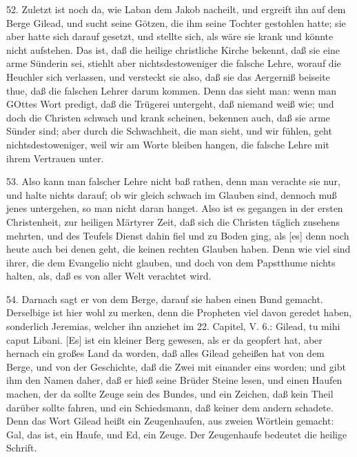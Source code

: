 52. Zuletzt ist noch da, wie Laban dem Jakob nacheilt, und ergreift ihn auf dem Berge Gilead, und sucht seine Götzen, die ihm seine Tochter gestohlen hatte; sie aber hatte sich darauf gesetzt, und stellte sich, als wäre sie krank und könnte nicht aufstehen. Das ist, daß die heilige christliche Kirche bekennt, daß sie eine arme Sünderin sei, stiehlt aber nichtsdestoweniger die falsche Lehre, worauf die Heuchler sich verlassen, und versteckt sie also, daß sie das Aergerniß beiseite thue, daß die falschen Lehrer darum kommen. Denn das sieht man: wenn man GOttes Wort predigt, daß die Trügerei untergeht, daß niemand weiß wie; und doch die Christen schwach und krank scheinen, bekennen auch, daß sie arme Sünder sind; aber durch die Schwachheit, die man sieht, und wir fühlen, geht nichtsdestoweniger, weil wir am Worte bleiben hangen, die falsche Lehre mit ihrem Vertrauen unter.

53. Also kann man falscher Lehre nicht baß rathen, denn man verachte sie nur, und halte nichts darauf; ob wir gleich schwach im Glauben sind, dennoch muß jenes untergehen, so man nicht daran hanget. Also ist es gegangen in der ersten Christenheit, zur heiligen Märtyrer Zeit, daß sich die Christen täglich zusehens mehrten, und des Teufels Dienst dahin fiel und zu Boden ging, als [es] denn noch heute auch bei denen geht, die keinen rechten Glauben haben. Denn wie viel sind ihrer, die dem Evangelio nicht glauben, und doch von dem Papstthume nichts halten, als, daß es von aller Welt verachtet wird.

54. Darnach sagt er von dem Berge, darauf sie haben einen Bund gemacht. Derselbige ist hier wohl zu merken, denn die Propheten viel davon geredet haben, sonderlich Jeremias, welcher ihn anziehet im 22. Capitel, V. 6.: Gilead, tu mihi caput Libani. [Es] ist ein kleiner Berg gewesen, als er da geopfert hat, aber hernach ein großes Land da worden, daß alles Gilead geheißen hat von dem Berge, und von der Geschichte, daß die Zwei mit einander eins worden; und gibt ihm den Namen daher, daß er hieß seine Brüder Steine lesen, und einen Haufen machen, der da sollte Zeuge sein des Bundes, und ein Zeichen, daß kein Theil darüber sollte fahren, und ein Schiedsmann, daß keiner dem andern schadete. Denn das Wort Gilead heißt ein Zeugenhaufen, aus zweien Wörtlein gemacht: Gal, das ist, ein Haufe, und Ed, ein Zeuge. Der Zeugenhaufe bedeutet die heilige Schrift.

